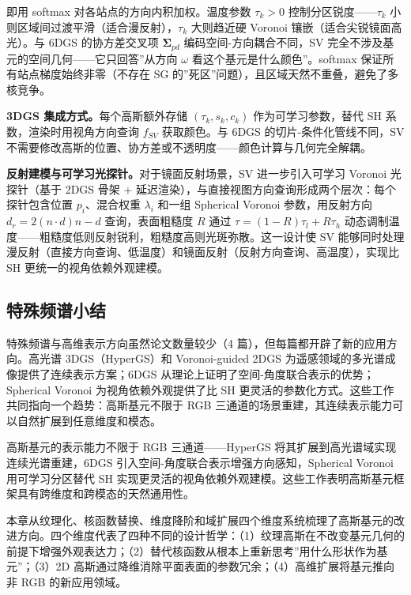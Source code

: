 即用 softmax 对各站点的方向内积加权。温度参数 $\tau_k>0$ 控制分区锐度——$\tau_k$ 小则区域间过渡平滑（适合漫反射），$\tau_k$ 大则趋近硬 Voronoi 镶嵌（适合尖锐镜面高光）。与 6DGS 的协方差交叉项 $\boldsymbol{\Sigma}_{pd}$ 编码空间-方向耦合不同，SV 完全不涉及基元的空间几何——它只回答”从方向 $\omega$ 看这个基元是什么颜色”。softmax 保证所有站点梯度始终非零（不存在 SG 的”死区”问题），且区域天然不重叠，避免了多核竞争。

\textbf{3DGS 集成方式。}每个高斯额外存储 $(\tau_k, s_k, c_k)$ 作为可学习参数，替代 SH 系数，渲染时用视角方向查询 $f_{SV}$ 获取颜色。与 6DGS 的切片-条件化管线不同，SV 不需要修改高斯的位置、协方差或不透明度——颜色计算与几何完全解耦。

\textbf{反射建模与可学习光探针。}对于镜面反射场景，SV 进一步引入可学习 Voronoi 光探针（基于 2DGS 骨架 + 延迟渲染），与直接视图方向查询形成两个层次：每个探针包含位置 $p_i$、混合权重 $\lambda_i$ 和一组 Spherical Voronoi 参数，用反射方向 $d_r=2(n\cdot d)n-d$ 查询，表面粗糙度 $R$ 通过 $\tau=(1-R)\tau_l+R\tau_h$ 动态调制温度——粗糙度低则反射锐利，粗糙度高则光斑弥散。这一设计使 SV 能够同时处理漫反射（直接方向查询、低温度）和镜面反射（反射方向查询、高温度），实现比 SH 更统一的视角依赖外观建模。

\subsection{特殊频谱小结}

特殊频谱与高维表示方向虽然论文数量较少（4 篇），但每篇都开辟了新的应用方向。高光谱 3DGS（HyperGS）和 Voronoi-guided 2DGS 为遥感领域的多光谱成像提供了连续表示方案；6DGS 从理论上证明了空间-角度联合表示的优势；Spherical Voronoi 为视角依赖外观提供了比 SH 更灵活的参数化方式。这些工作共同指向一个趋势：高斯基元不限于 RGB 三通道的场景重建，其连续表示能力可以自然扩展到任意维度和模态。

\begin{takeaway}
高斯基元的表示能力不限于 RGB 三通道——HyperGS 将其扩展到高光谱域实现连续光谱重建，6DGS 引入空间-角度联合表示增强方向感知，Spherical Voronoi 用可学习分区替代 SH 实现更灵活的视角依赖外观建模。这些工作表明高斯基元框架具有跨维度和跨模态的天然通用性。
\end{takeaway}


本章从纹理化、核函数替换、维度降阶和域扩展四个维度系统梳理了高斯基元的改进方向。四个维度代表了四种不同的设计哲学：（1）纹理高斯在不改变基元几何的前提下增强外观表达力；（2）替代核函数从根本上重新思考”用什么形状作为基元”；（3）2D 高斯通过降维消除平面表面的参数冗余；（4）高维扩展将基元推向非 RGB 的新应用领域。

